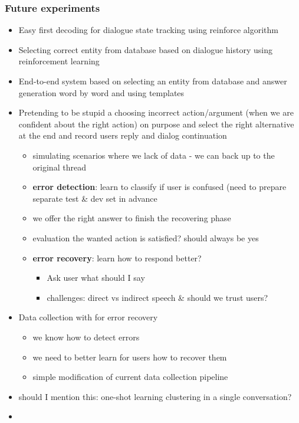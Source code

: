 \documentclass[11pt]{article}
\begin{document}
\subsubsection*{Future experiments}

\begin{itemize}
    \item Easy first decoding for dialogue state tracking using reinforce algorithm
    \item Selecting correct entity from database based on dialogue history using reinforcement learning
    \item End-to-end system based on selecting an entity from database and answer generation word by word and using templates
    \item Pretending to be stupid a choosing incorrect action/argument
		(when we are confident about the right action) 
			on purpose and select the right alternative at the end
			and record users reply and dialog continuation
        \begin{itemize}
			\item simulating scenarios where we lack of data - we can back up to the original thread
			\item {\bf error detection}: learn to classify if user is confused (need to prepare separate test \& dev set in advance
            \item we offer the right answer to finish the recovering phase
            \item evaluation the wanted action is satisfied? should always be yes
            \item {\bf error recovery}: learn how to respond better? 
                \begin{itemize}
					\item Ask user what should I say
                    \item challenges: direct vs indirect speech \& should we trust users? 
                \end{itemize}
        \end{itemize}
	\item Data collection with for error recovery
	\begin{itemize}
		\item we know how to detect errors
		\item we need to better learn for users how to recover them
		\item simple modification of current data collection pipeline
	\end{itemize}
    \item should I mention this: one-shot learning clustering in a single conversation?
	\item 

\end{itemize}
\end{document}

